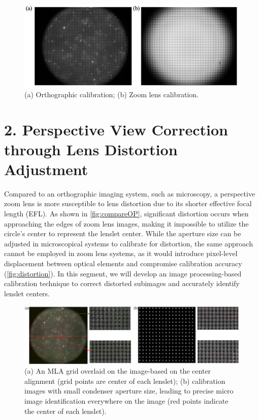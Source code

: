 \documentclass[draftthesis,fullpage]{uiucthesis}
\begin{document}
\begin{figure}[h]
  \centerline{\includegraphics[width = 0.7\linewidth]{fig/CompareOP.png}} 
  \caption{(a) Orthographic calibration; (b) Zoom lens calibration. }
\label{fig:compareOP}
\end{figure}


\section*{2. Perspective View Correction through Lens Distortion Adjustment}
Compared to an orthographic imaging system, such as microscopy, a perspective zoom lens is more susceptible to lens distortion due to its shorter effective focal length (EFL). As shown in \autoref{fig:compareOP}, significant distortion occurs when approaching the edges of zoom lens images, making it impossible to utilize the circle's center to represent the lenslet center. While the aperture size can be adjusted in microscopical systems to calibrate for distortion, the same approach cannot be employed in zoom lens systems, as it would introduce pixel-level displacement between optical elements and compromise calibration accuracy (\autoref{fig:distortion}). In this segment, we will develop an image processing-based calibration technique to correct distorted subimages and accurately identify lenslet centers.


\begin{figure}[h]
  \centerline{\includegraphics[width=0.9\linewidth]{fig/figure7.jpg}} 
  \caption{(a) An MLA grid overlaid on the image-based on the center alignment (grid points are center of each lenslet); (b) calibration images with small condenser aperture size, leading to precise micro image identification everywhere on the image (red points indicate the center of each lenslet).}
\label{fig:distortion}
\end{figure}
\end{document}

